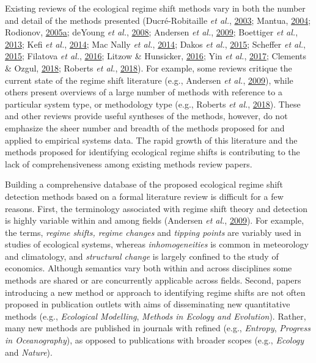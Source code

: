 \documentclass[print]{nuthesis}
\begin{document}
Existing reviews of the ecological regime shift methods vary in both the number and detail of the methods presented (Ducré-Robitaille \emph{et al.}, \protect\hyperlink{ref-ducre2003comparison}{2003}; Mantua, \protect\hyperlink{ref-mantua_methods_2004}{2004}; Rodionov, \protect\hyperlink{ref-rodionov_brief_2005}{2005}\protect\hyperlink{ref-rodionov_brief_2005}{a}; deYoung \emph{et al.}, \protect\hyperlink{ref-deyoung_regime_2008}{2008}; Andersen \emph{et al.}, \protect\hyperlink{ref-andersen_ecological_2009}{2009}; Boettiger \emph{et al.}, \protect\hyperlink{ref-boettiger_early_2013}{2013}; Kefi \emph{et al.}, \protect\hyperlink{ref-kefi2014early}{2014}; Mac Nally \emph{et al.}, \protect\hyperlink{ref-mac2014scrutiny}{2014}; Dakos \emph{et al.}, \protect\hyperlink{ref-dakos2015resilience}{2015}; Scheffer \emph{et al.}, \protect\hyperlink{ref-scheffer2015generic}{2015}; Filatova \emph{et al.}, \protect\hyperlink{ref-filatova2016regime}{2016}; Litzow \& Hunsicker, \protect\hyperlink{ref-litzow_early_2016}{2016}; Yin \emph{et al.}, \protect\hyperlink{ref-yin2017methods}{2017}; Clements \& Ozgul, \protect\hyperlink{ref-clements2018indicators}{2018}; Roberts \emph{et al.}, \protect\hyperlink{ref-roberts2018early}{2018}). For example, some reviews critique the current state of the regime shift literature (e.g., Andersen \emph{et al.}, \protect\hyperlink{ref-andersen_ecological_2009}{2009}), while others present overviews of a large number of methods with reference to a particular system type, or methodology type (e.g., Roberts \emph{et al.}, \protect\hyperlink{ref-roberts2018early}{2018}). These and other reviews provide useful syntheses of the methods, however, do not emphasize the sheer number and breadth of the methods proposed for and applied to empirical systems data. The rapid growth of this literature and the methods proposed for identifying ecological regime shifts is contributing to the lack of comprehensiveness among existing methods review papers.

Building a comprehensive database of the proposed ecological regime shift detection methods based on a formal literature review is difficult for a few reasons. First, the terminology associated with regime shift theory and detection is highly variable within and among fields (Andersen \emph{et al.}, \protect\hyperlink{ref-andersen_ecological_2009}{2009}). For example, the terms, \emph{regime shifts, regime changes} and \emph{tipping points} are variably used in studies of ecological systems, whereas \emph{inhomogeneities} is common in meteorology and climatology, and \emph{structural change} is largely confined to the study of economics. Although semantics vary both within and across disciplines some methods are shared or are concurrently applicable across fields. Second, papers introducing a new method or approach to identifying regime shifts are not often proposed in publication outlets with aims of disseminating new quantitative methods (e.g., \emph{Ecological Modelling}, \emph{Methods in Ecology and Evolution}). Rather, many new methods are published in journals with refined (e.g., \emph{Entropy}, \emph{Progress in Oceanography}), as opposed to publications with broader scopes (e.g., \emph{Ecology} and \emph{Nature}).
\end{document}
